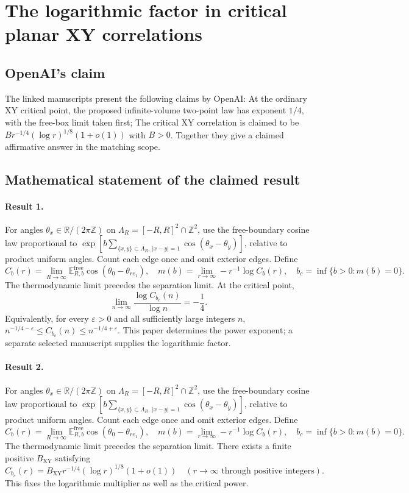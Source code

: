 \documentclass[11pt]{article}
\begin{document}
\section*{The logarithmic factor in critical planar XY correlations}

\subsection{OpenAI's claim}
The linked manuscripts present the following claims by OpenAI: At the ordinary XY critical point, the proposed infinite-volume two-point law has exponent $1/4$, with the free-box limit taken first; The critical XY correlation is claimed to be $B r^{-1/4}(\log r)^{1/8}(1+o(1))$ with $B>0$. Together they give a claimed affirmative answer in the matching scope.

\subsection{Mathematical statement of the claimed result}
\paragraph{Result 1.} For angles $\theta_x\in\mathbb R/(2\pi\mathbb Z)$ on $\Lambda_R=[-R,R]^2\cap\mathbb Z^2$, use the free-boundary cosine law proportional to $\exp[b\sum_{\{x,y\}\subset\Lambda_R,\,|x-y|=1}\cos(\theta_x-\theta_y)]$, relative to product uniform angles. Count each edge once and omit exterior edges. Define
\[
 C_b(r)=\lim_{R\to\infty}\mathbb E_{R,b}^{\mathrm{free}}\cos(\theta_0-\theta_{re_1}),\quad
 m(b)=\lim_{r\to\infty}-r^{-1}\log C_b(r),\quad b_c=\inf\{b>0:m(b)=0\}.
\]
The thermodynamic limit precedes the separation limit. At the critical point,
\[
 \lim_{n\to\infty}\frac{\log C_{b_c}(n)}{\log n}=-\frac14.
\]
Equivalently, for every $\varepsilon>0$ and all sufficiently large integers $n$, $n^{-1/4-\varepsilon}\le C_{b_c}(n)\le n^{-1/4+\varepsilon}$. This paper determines the power exponent; a separate selected manuscript supplies the logarithmic factor.

\paragraph{Result 2.} For angles $\theta_x\in\mathbb R/(2\pi\mathbb Z)$ on $\Lambda_R=[-R,R]^2\cap\mathbb Z^2$, use the free-boundary cosine law proportional to $\exp[b\sum_{\{x,y\}\subset\Lambda_R,\,|x-y|=1}\cos(\theta_x-\theta_y)]$, relative to product uniform angles. Count each edge once and omit exterior edges. Define
\[
 C_b(r)=\lim_{R\to\infty}\mathbb E_{R,b}^{\mathrm{free}}\cos(\theta_0-\theta_{re_1}),\quad
 m(b)=\lim_{r\to\infty}-r^{-1}\log C_b(r),\quad b_c=\inf\{b>0:m(b)=0\}.
\]
The thermodynamic limit precedes the separation limit. There exists a finite positive $B_{\mathrm{XY}}$ satisfying
\[
 C_{b_c}(r)=B_{\mathrm{XY}}r^{-1/4}(\log r)^{1/8}(1+o(1))\quad(r\to\infty\text{ through positive integers}).
\]
This fixes the logarithmic multiplier as well as the critical power.
\end{document}
